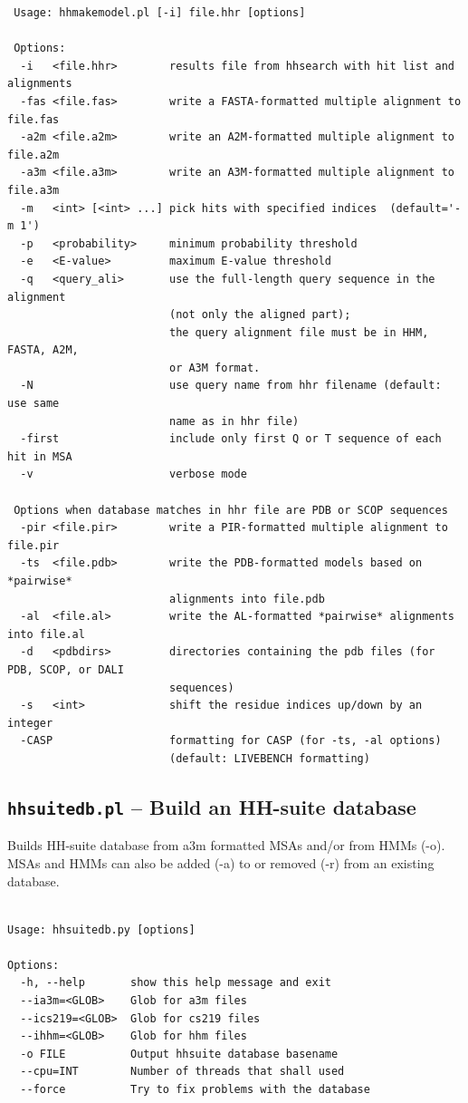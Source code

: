 \documentclass[11pt,a4paper]{article}
\begin{document}
\small 
\begin{verbatim}
 Usage: hhmakemodel.pl [-i] file.hhr [options]

 Options:
  -i   <file.hhr>        results file from hhsearch with hit list and alignments
  -fas <file.fas>        write a FASTA-formatted multiple alignment to file.fas
  -a2m <file.a2m>        write an A2M-formatted multiple alignment to file.a2m
  -a3m <file.a3m>        write an A3M-formatted multiple alignment to file.a3m
  -m   <int> [<int> ...] pick hits with specified indices  (default='-m 1')
  -p   <probability>     minimum probability threshold     
  -e   <E-value>         maximum E-value threshold      
  -q   <query_ali>       use the full-length query sequence in the alignment 
                         (not only the aligned part);
                         the query alignment file must be in HHM, FASTA, A2M,  
                         or A3M format.
  -N                     use query name from hhr filename (default: use same  
                         name as in hhr file)
  -first                 include only first Q or T sequence of each hit in MSA
  -v                     verbose mode

 Options when database matches in hhr file are PDB or SCOP sequences
  -pir <file.pir>        write a PIR-formatted multiple alignment to file.pir 
  -ts  <file.pdb>        write the PDB-formatted models based on *pairwise*  
                         alignments into file.pdb
  -al  <file.al>         write the AL-formatted *pairwise* alignments into file.al
  -d   <pdbdirs>         directories containing the pdb files (for PDB, SCOP, or DALI  
                         sequences)
  -s   <int>             shift the residue indices up/down by an integer           
  -CASP                  formatting for CASP (for -ts, -al options) 
                         (default: LIVEBENCH formatting)
\end{verbatim} 
\normalsize


\subsection{{\tt hhsuitedb.pl} -- Build an HH-suite database }

Builds HH-suite database from a3m formatted MSAs and/or from HMMs (-o).
MSAs and HMMs can also be added (-a) to or removed (-r) from an existing database. 

\small 
\begin{verbatim}

Usage: hhsuitedb.py [options]

Options:
  -h, --help       show this help message and exit
  --ia3m=<GLOB>    Glob for a3m files
  --ics219=<GLOB>  Glob for cs219 files
  --ihhm=<GLOB>    Glob for hhm files
  -o FILE          Output hhsuite database basename
  --cpu=INT        Number of threads that shall used
  --force          Try to fix problems with the database

\end{verbatim} 
\normalsize
\end{document}
